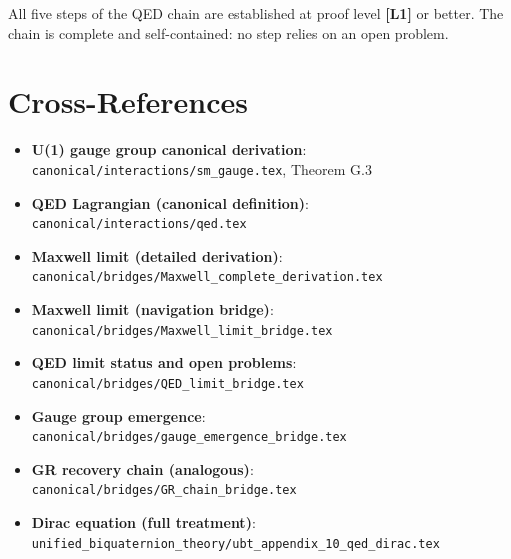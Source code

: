 \documentclass[11pt,a4paper]{article}
\newcommand{\Lone}{\textbf{[L1]}}
\begin{document}
All five steps of the QED chain are established at proof level \Lone{} or
better. The chain is complete and self-contained: no step relies on an open
problem.

\section{Cross-References}

\begin{itemize}
  \item \textbf{U(1) gauge group canonical derivation}:
        \texttt{canonical/interactions/sm\_gauge.tex}, Theorem G.3
  \item \textbf{QED Lagrangian (canonical definition)}:
        \texttt{canonical/interactions/qed.tex}
  \item \textbf{Maxwell limit (detailed derivation)}:
        \texttt{canonical/bridges/Maxwell\_complete\_derivation.tex}
  \item \textbf{Maxwell limit (navigation bridge)}:
        \texttt{canonical/bridges/Maxwell\_limit\_bridge.tex}
  \item \textbf{QED limit status and open problems}:
        \texttt{canonical/bridges/QED\_limit\_bridge.tex}
  \item \textbf{Gauge group emergence}:
        \texttt{canonical/bridges/gauge\_emergence\_bridge.tex}
  \item \textbf{GR recovery chain (analogous)}:
        \texttt{canonical/bridges/GR\_chain\_bridge.tex}
  \item \textbf{Dirac equation (full treatment)}:
        \texttt{unified\_biquaternion\_theory/ubt\_appendix\_10\_qed\_dirac.tex}
\end{itemize}
\end{document}
